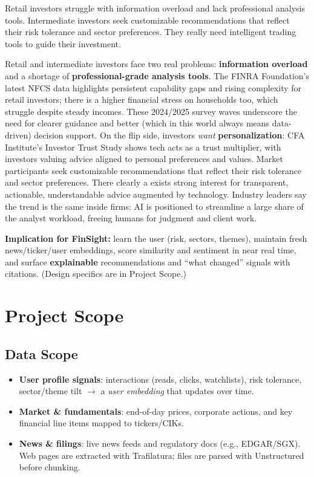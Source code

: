 Retail investors struggle with information overload and lack professional analysis tools. Intermediate investors seek customizable recommendations that reflect their risk tolerance and sector preferences. They really need intelligent trading tools to guide their investment.

Retail and intermediate investors face two real problems: \textbf{information overload} and a shortage of \textbf{professional-grade analysis tools}. The FINRA Foundation’s latest NFCS data highlights persistent capability gaps and rising complexity for retail investors; there is a higher financial stress on households too, which struggle despite steady incomes. These 2024/2025 survey waves underscore the need for clearer guidance and better (which in this world always means data-driven) decision support. \parencite{finra_nfcs_portal,finra_nfcs_2025,finra_nfcs_press_2025} On the flip side, investors \emph{want} \textbf{personalization}: CFA Institute’s Investor Trust Study shows tech acts as a trust multiplier, with investors valuing advice aligned to personal preferences and values. Market participants seek customizable recommendations that reflect their risk tolerance and sector preferences. There clearly a exists strong interest for transparent, actionable, understandable advice augmented by technology. \parencite{cfa_personalization_2024,cfa_trust_2022_pdf} Industry leaders say the trend is the same inside firms: AI is positioned to streamline a large share of the analyst workload, freeing humans for judgment and client work. \parencite{fnl_bbg_analyst_80_2025}

\textbf{Implication for FinSight:} learn the user (risk, sectors, themes), maintain fresh news/ticker/user embeddings, score similarity and sentiment in near real time, and surface \textbf{explainable} recommendations and “what changed” signals with citations. (Design specifics are in Project Scope.)


\section{Project Scope}

\subsection{Data Scope}
\begin{itemize}
  \item \textbf{User profile signals}: interactions (reads, clicks, watchlists), risk tolerance, sector/theme tilt $\rightarrow$ a \emph{user embedding} that updates over time.
  \item \textbf{Market \& fundamentals}: end-of-day prices, corporate actions, and key financial line items mapped to tickers/CIKs.
  \item \textbf{News \& filings}: live news feeds and regulatory docs (e.g., EDGAR/SGX). Web pages are extracted with Trafilatura; files are parsed with Unstructured before chunking. \parencite{trafilatura_docs,unstructured_partition}
\end{itemize}

